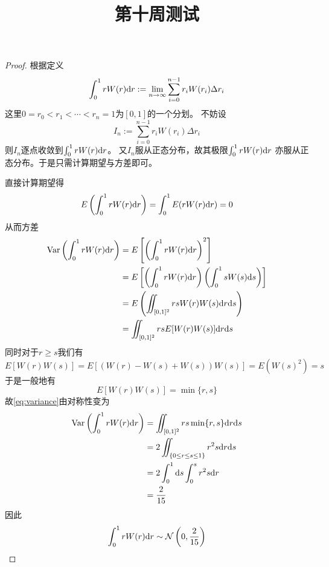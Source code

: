 \documentclass[cn]{homework}
\title{第十周测试}
\begin{document}
    \maketitle

    \begin{proof}
        根据定义
        \[\int_0^1rW(r)\mathrm d r
        :=\lim_{n\to\infty}\sum_{i=0}^{n-1}r_iW(r_i)\Delta r_i\]
        这里$0=r_0<r_1<\cdots<r_n=1$为$[0,1]$的一个分划。
        不妨设
        \[I_n:=\sum_{i=0}^{n-1}r_iW(r_i)\Delta r_i\]
        则$I_n$逐点收敛到$\int_0^1rW(r)\mathrm d r$。
        又$I_n$服从正态分布，故其极限$\int_0^1rW(r)\mathrm d r$
        亦服从正态分布。于是只需计算期望与方差即可。

        直接计算期望得
        \[E\left(\int_0^1rW(r)\mathrm d r\right)
        =\int_0^1E(rW(r)\mathrm d r)=0\]
        从而方差
        \begin{equation}
            \label{eq:variance}
            \begin{aligned}
            \mathrm{Var}\left(\int_0^1rW(r)\mathrm d r\right)
            &=E\left[\left(\int_0^1rW(r)\mathrm d r\right)^2\right]\\
            &=E\left[\left(\int_0^1rW(r)\mathrm d r\right)
                \left(\int_0^1sW(s)\mathrm d s\right)\right]\\
            &=E\left(\iint_{[0,1]^2}rsW(r)W(s)\mathrm d r\mathrm d s\right)\\
            &=\iint_{[0,1]^2}rsE[W(r)W(s)]\mathrm d r\mathrm d s\\
            \end{aligned}
        \end{equation}
        同时对于$r\geq s$我们有
        \[E[W(r)W(s)]=E[(W(r)-W(s)+W(s))W(s)]=E(W(s)^2)=s\]
        于是一般地有
        \[E[W(r)W(s)]=\min\{r,s\}\]
        故\cref{eq:variance}由对称性变为
        \[\begin{aligned}
            \mathrm{Var}\left(\int_0^1rW(r)\mathrm d r\right)
            &=\iint_{[0,1]^2}rs\min\{r,s\}\mathrm d r\mathrm d s\\
            &=2\iint_{\{0\leq r\leq s\leq 1\}}r^2s\mathrm d r\mathrm d s\\
            &=2\int_0^1\mathrm d s\int_0^sr^2s\mathrm d r\\
            &=\frac{2}{15}
        \end{aligned}\]
        因此
        \[\int_0^1rW(r)\mathrm d r
        \sim\mathcal N\left(0,\frac{2}{15}\right)\]
    \end{proof}
\end{document}
